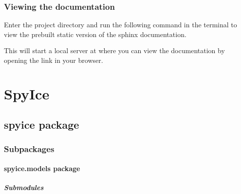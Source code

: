 \documentclass[a4paper,11pt,english,openany]{sphinxmanual}
\begin{document}
\subsection{Viewing the documentation}
\label{\detokenize{quick_start/installation:viewing-the-documentation}}
\sphinxAtStartPar
Enter the project directory and run the following command in the terminal to view the pre\sphinxhyphen{}built static version of the sphinx documentation.
\begin{quote}

\sphinxAtStartPar
{}
\end{quote}

\sphinxAtStartPar
This will start a local server at  where you can view the documentation by opening the link in your browser.

\sphinxstepscope


\chapter{SpyIce}
\label{\detokenize{api/_index:spyice}}\label{\detokenize{api/_index::doc}}
\sphinxstepscope


\section{spyice package}
\label{\detokenize{api/spyice:spyice-package}}\label{\detokenize{api/spyice::doc}}

\subsection{Subpackages}
\label{\detokenize{api/spyice:subpackages}}
\sphinxstepscope


\subsubsection{spyice.models package}
\label{\detokenize{api/spyice.models:spyice-models-package}}\label{\detokenize{api/spyice.models::doc}}

\paragraph{Submodules}
\label{\detokenize{api/spyice.models:submodules}}
\sphinxstepscope
\end{document}
